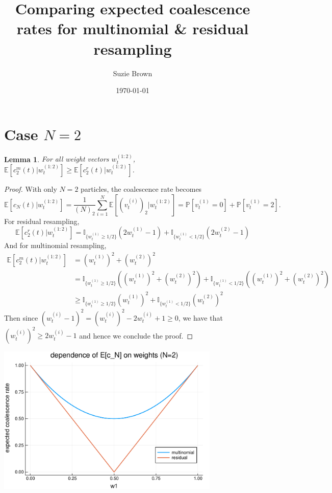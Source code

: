 \documentclass[fleqn]{article}
\title{Comparing expected coalescence rates for multinomial \& residual resampling}
\author{Suzie Brown}
\date{\today}
\newtheorem{lemma}{Lemma}
\theoremstyle{definition}
\newcommand{\PR}{\mathbb{P}}
\newcommand{\E}{\mathbb{E}}
\newcommand{\I}[1]{\mathbb{I}_{\{#1\}}}
\newcommand{\vt}[2][t]{v_{#1}^{(#2)}}
\newcommand{\wt}[2][t]{w_{#1}^{(#2)}}
\begin{document}
\maketitle
\thispagestyle{fancy}

\section*{Case $N=2$}
\begin{lemma}
For all weight vectors $\wt{1:2}$, 
$\E[c_2^m(t) |\wt{1:2}] \geq \E[c_2^r(t) |\wt{1:2}]$.
\end{lemma}

\begin{proof}
With only $N=2$ particles, the coalescence rate becomes
\begin{equation*}
\E[c_N(t) |\wt{1:2}] = \frac{1}{(N)_2} \sum_{i=1}^{N} \E\left[ (\vt{i})_2 |\wt{1:2} \right] 
= \PR[\vt{1} = 0] + \PR[\vt{1} = 2].
\end{equation*}
For residual resampling,
\begin{equation*}
\E[c_2^r(t) |\wt{1:2}] = \I{\wt{1} \geq 1/2} (2\wt{1} -1) + \I{\wt{1} < 1/2} (2\wt{2} -1)
\end{equation*}
And for multinomial resampling,
\begin{align*}
\E[c_2^m(t) |\wt{1:2}] &= (\wt{1})^2 + (\wt{2})^2 \\
&= \I{\wt{1} \geq 1/2} ((\wt{1})^2 + (\wt{2})^2) + \I{\wt{1} < 1/2} ((\wt{1})^2 + (\wt{2})^2) \\
&\geq  \I{\wt{1} \geq 1/2} (\wt{1})^2 + \I{\wt{1} < 1/2} (\wt{2})^2
\end{align*}
Then since $(\wt{i} -1)^2 = (\wt{i})^2 -2\wt{i} +1 \geq 0$, we have that $(\wt{i})^2 \geq 2\wt{i} -1$ and hence we conclude the proof.
\end{proof}

\begin{center}
\includegraphics[width=0.8\textwidth]{plots/EcN_mn_res_N2.pdf}
\end{center}
\end{document}
